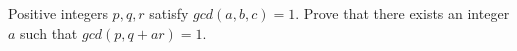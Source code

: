 Positive integers $p, q, r$ satisfy $gcd(a,b,c) = 1$.
Prove that there exists an integer $a$ such that $gcd(p,q+ar) = 1$.